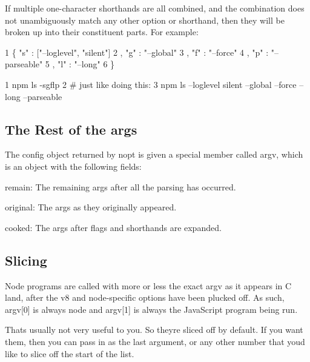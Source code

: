 If multiple one-\/character shorthands are all combined, and the combination does not unambiguously match any other option or shorthand, then they will be broken up into their constituent parts. For example\+:


\begin{DoxyCode}
1 \{ "s" : ["--loglevel", "silent"]
2 , "g" : "--global"
3 , "f" : "--force"
4 , "p" : "--parseable"
5 , "l" : "--long"
6 \}
\end{DoxyCode}



\begin{DoxyCode}
1 npm ls -sgflp
2 # just like doing this:
3 npm ls --loglevel silent --global --force --long --parseable
\end{DoxyCode}


\subsection*{The Rest of the args}

The config object returned by nopt is given a special member called {\ttfamily argv}, which is an object with the following fields\+:


\begin{DoxyItemize}
\item {\ttfamily remain}\+: The remaining args after all the parsing has occurred.
\item {\ttfamily original}\+: The args as they originally appeared.
\item {\ttfamily cooked}\+: The args after flags and shorthands are expanded.
\end{DoxyItemize}

\subsection*{Slicing}

Node programs are called with more or less the exact argv as it appears in C land, after the v8 and node-\/specific options have been plucked off. As such, {\ttfamily argv\mbox{[}0\mbox{]}} is always {\ttfamily node} and {\ttfamily argv\mbox{[}1\mbox{]}} is always the Java\+Script program being run.

That\textquotesingle{}s usually not very useful to you. So they\textquotesingle{}re sliced off by default. If you want them, then you can pass in {} as the last argument, or any other number that you\textquotesingle{}d like to slice off the start of the list. 